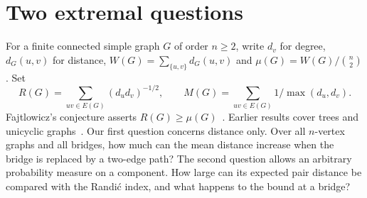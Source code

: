 \documentclass[11pt,a4paper]{article}
\begin{document}
\section{Two extremal questions}
For a finite connected simple graph $G$ of order $n\ge2$, write $d_v$ for
degree, $d_G(u,v)$ for distance, $W(G)=\sum_{\{u,v\}}d_G(u,v)$ and
$\mu(G)=W(G)/\binom n2$. Set
\[
 R(G)=\sum_{uv\in E(G)}(d_ud_v)^{-1/2},\qquad
 M(G)=\sum_{uv\in E(G)}1/\max(d_u,d_v).
\]
Fajtlowicz's conjecture asserts $R(G)\ge\mu(G)$~\cite{p09-Faj}.
Earlier results cover trees and unicyclic graphs~\cite{p09-Tree,p09-Uni}.
Our first question concerns distance only. Over all $n$-vertex graphs
and all bridges, how much can the mean distance increase when the bridge
is replaced by a two-edge path? The second question allows an arbitrary
probability measure on a component. How large can its expected pair distance
be compared with the Randi\'c index, and what happens to the bound at a bridge?
\end{document}

